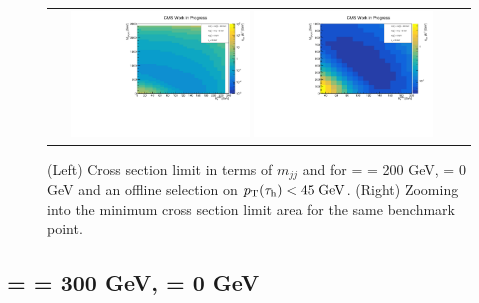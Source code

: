 \begin{figure}[tbh!]
	\centering
	\begin{tabular}{cc}
		\includegraphics[width=0.45\textwidth]{analysis/pics/JetInvMass_vs_MET_xsec_chi200_lsp000_taupt45.pdf}
		\includegraphics[width=0.45\textwidth]{analysis/pics/JetInvMass_vs_MET_xsec_chi200_lsp000_taupt45_zoom.pdf} 		
	\end{tabular}
	\caption{(Left) Cross section limit in terms of $m_{jj}$ and \met for \charginopm = \neutralinotwo = 200 GeV, \neutralinoone = 0 GeV and an offline selection on $p_{\text{T}}(\tau_{\text{h}}) <  45\;\text{Ge}\kern-0.06667em\text{V}$. (Right) Zooming into the minimum cross section limit area for the same benchmark point.}
	\label{fig::JetInvMass_vs_MET_xsec_chi200_lsp000_taupt45}
\end{figure}

\clearpage

\subsection*{\charginopm = \neutralinotwo = 300 GeV, \neutralinoone = 0 GeV}

